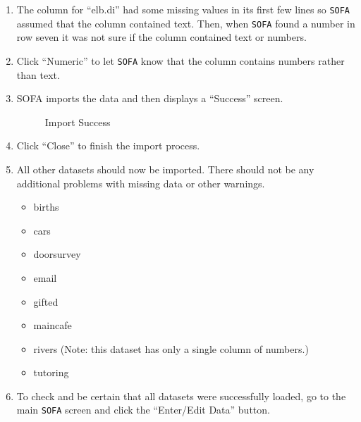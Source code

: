 \begin{enumerate}
  \item The column for ``elb.di'' had some missing values in its first few lines so \texttt{SOFA} assumed that the column contained text. Then, when \texttt{SOFA} found a number in row seven it was not sure if the column contained text or numbers.
  \item Click ``Numeric'' to let \texttt{SOFA} know that the column contains numbers rather than text.
  \item SOFA imports the data and then displays a ``Success'' screen.
  
  \begin{figure}[H]
    \begin{center}
      \caption{Import Success}
    \end{center}
  \end{figure}

  \item Click ``Close'' to finish the import process.
  \item All other datasets should now be imported. There should not be any additional problems with missing data or other warnings.
  
  \begin{itemize}
    \item births
    \item cars
    \item doorsurvey
    \item email
    \item gifted
    \item maincafe
    \item rivers (Note: this dataset has only a single column of numbers.)
    \item tutoring
  \end{itemize}
  
  \item To check and be certain that all datasets were successfully loaded, go to the main \texttt{SOFA} screen and click the ``Enter/Edit Data'' button.
  

\end{enumerate}
